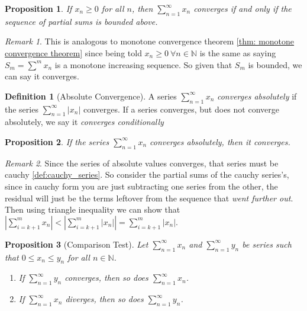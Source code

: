 \documentclass{article}
\newtheorem{proposition}{Proposition}[section]
\theoremstyle{definition}
\newtheorem{definition}{Definition}[section]
\theoremstyle{remark}
\newtheorem{remark}{Remark}[section]
\begin{document}
\begin{proposition}
If $x_n \geq 0$ for all $n$, then $\sum_{n=1}^{\infty} x_n$ converges if and only if the sequence of partial sums is bounded above.
\end{proposition}

\begin{remark}
This is analogous to monotone convergence theorem \ref{thm: monotone convergence theorem} since being told 
$x_n \geq 0 \ \forall n \in \mathbb{N}$ is the same as saying $S_m = \sum^m{x_n}$ is 
a monotone increasing sequence. So given that $S_m$ is bounded, we can say it converges.
\end{remark}



\begin{definition}[Absolute Convergence]\label{def:absolute_Convergence_series}
A series $\sum_{n=1}^{\infty} x_n$ \textit{converges absolutely} if the series $\sum_{n=1}^{\infty} |x_n|$ converges. If a series converges, but does not converge absolutely, we say it \textit{converges conditionally}
\end{definition}




\begin{proposition}
If the series $\sum_{n=1}^{\infty} x_n$ converges absolutely, then it converges.
\end{proposition}
\begin{remark}
Since the series of absolute values converges, that series must
be cauchy \ref{def:cauchy_series}. So consider the partial sums
of the cauchy series's, since in cauchy form you are just subtracting one series from the other,
the residual will just be the terms leftover from the sequence that \textit{went further out}.
Then using triangle inequality we can show that $\left|\sum^m_{i=k+1}{x_n}\right| < \left|\sum^m_{i=k+1}{|x_n|}\right| = \sum^m_{i=k+1}{|x_n|}$.
\end{remark}




\begin{proposition}[Comparison Test]\label{prp:comparison_test_series}
Let $\sum_{n=1}^{\infty} x_n$ and $\sum_{n=1}^{\infty} y_n$ be series such that $0 \leq x_n \leq y_n$ for all $n \in \mathbb{N}$.
\begin{enumerate}
\item If $\sum_{n=1}^{\infty} y_n$ converges, then so does $\sum_{n=1}^{\infty} x_n$.
\item If $\sum_{n=1}^{\infty} x_n$ diverges, then so does $\sum_{n=1}^{\infty} y_n$.
\end{enumerate}
\end{proposition}
\end{document}
